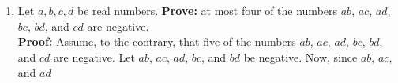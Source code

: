 \documentclass[12pt]{article}
\begin{document}
\begin{enumerate}
        \item Let \(a,b,c,d\) be real numbers. \textbf{Prove:} at most four of the numbers \(ab\), \(ac\), \(ad\), \(bc\), \(bd\), and \(cd\) are negative. \\ \textbf{Proof:} Assume, to the contrary, that five of the numbers \(ab\), \(ac\), \(ad\), \(bc\), \(bd\), and \(cd\) are negative. Let \(ab\), \(ac\), \(ad\), \(bc\), and \(bd\) be negative. Now, since \(ab\), \(ac\), and \(ad\)
    \end{enumerate}
\end{document}
